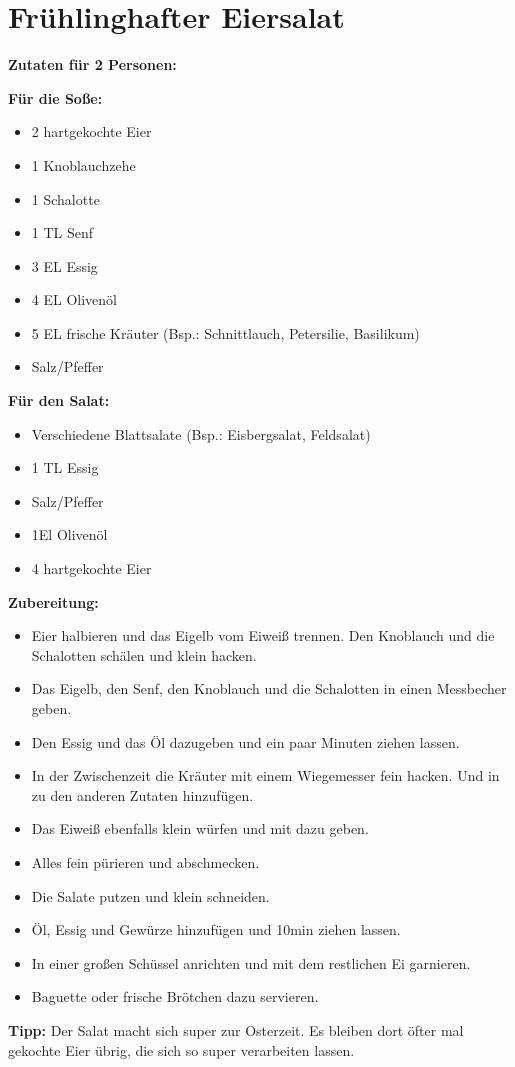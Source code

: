 \section{Frühlinghafter Eiersalat}

\textbf{Zutaten für 2 Personen:}

\textbf{Für die Soße:}
\begin{itemize}
  \item 2 hartgekochte Eier
  \item 1 Knoblauchzehe
  \item 1 Schalotte
  \item 1 TL Senf
  \item 3 EL Essig
  \item 4 EL Olivenöl
  \item 5 EL frische Kräuter (Bsp.: Schnittlauch, Petersilie, Basilikum)
  \item Salz/Pfeffer
\end{itemize}

\textbf{Für den Salat:}
\begin{itemize}
  \item Verschiedene Blattsalate (Bsp.: Eisbergsalat, Feldsalat)
  \item 1 TL Essig
  \item Salz/Pfeffer
  \item 1El Olivenöl
  \item 4 hartgekochte Eier
\end{itemize}

\textbf{Zubereitung:}
\begin{itemize}
  \item Eier halbieren und das Eigelb vom Eiweiß trennen. Den Knoblauch und die Schalotten schälen und klein hacken.
  \item Das Eigelb, den Senf, den Knoblauch und die Schalotten in einen Messbecher geben.
  \item Den Essig und das Öl dazugeben und ein paar Minuten ziehen lassen.
  \item In der Zwischenzeit die Kräuter mit einem Wiegemesser fein hacken. Und in zu den anderen Zutaten hinzufügen.
  \item Das Eiweiß ebenfalls klein würfen und mit dazu geben.
  \item Alles fein pürieren und abschmecken.
  \item Die Salate putzen und klein schneiden.
  \item Öl, Essig und Gewürze hinzufügen und 10min ziehen lassen.
  \item In einer großen Schüssel anrichten und mit dem restlichen Ei garnieren.
  \item Baguette oder frische Brötchen dazu servieren.
\end{itemize}

\textbf{Tipp:}
Der Salat macht sich super zur Osterzeit. Es bleiben dort öfter mal gekochte Eier übrig, die sich so super verarbeiten lassen.
